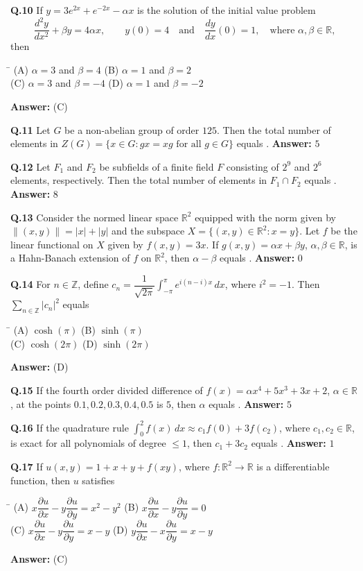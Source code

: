 \documentclass[11pt,a4paper]{article}
\newcommand{\optsfourA}[4]{%
  \begin{tabbing}
    \hspace{0.48\linewidth}\=\kill
    (A) #1 \> (B) #2 \\[2pt]
    (C) #3 \> (D) #4
  \end{tabbing}%
}
\newcommand{\ans}[1]{\textbf{Answer:} #1\par\medskip}
\begin{document}
\textbf{Q.10} If $y = 3e^{2x} + e^{-2x} - \alpha x$ is the solution of the initial value problem
\[
  \frac{d^2 y}{dx^2} + \beta y = 4\alpha x, \qquad y(0) = 4 \quad \text{and} \quad \frac{dy}{dx}(0) = 1, \quad \text{where } \alpha, \beta \in \mathbb{R},
\]
then
\optsfourA{$\alpha = 3$ and $\beta = 4$}{$\alpha = 1$ and $\beta = 2$}{$\alpha = 3$ and $\beta = -4$}{$\alpha = 1$ and $\beta = -2$}
\ans{(C)}

\textbf{Q.11} Let $G$ be a non-abelian group of order $125$. Then the total number of elements in $Z(G) = \{x \in G : gx = xg \text{ for all } g \in G\}$ equals \underline{\hspace{2cm}}.
\ans{$5$}

\textbf{Q.12} Let $F_1$ and $F_2$ be subfields of a finite field $F$ consisting of $2^9$ and $2^6$ elements, respectively. Then the total number of elements in $F_1 \cap F_2$ equals \underline{\hspace{2cm}}.
\ans{$8$}

\textbf{Q.13} Consider the normed linear space $\mathbb{R}^2$ equipped with the norm given by $\|(x, y)\| = |x| + |y|$ and the subspace $X = \{(x, y) \in \mathbb{R}^2 : x = y\}$. Let $f$ be the linear functional on $X$ given by $f(x, y) = 3x$. If $g(x, y) = \alpha x + \beta y$, $\alpha, \beta \in \mathbb{R}$, is a Hahn-Banach extension of $f$ on $\mathbb{R}^2$, then $\alpha - \beta$ equals \underline{\hspace{2cm}}.
\ans{$0$}

\textbf{Q.14} For $n \in \mathbb{Z}$, define $c_n = \dfrac{1}{\sqrt{2\pi}} \displaystyle\int_{-\pi}^{\pi} e^{i(n - i)x}\,dx$, where $i^2 = -1$. Then $\displaystyle\sum_{n \in \mathbb{Z}} |c_n|^2$ equals
\optsfourA{$\cosh(\pi)$}{$\sinh(\pi)$}{$\cosh(2\pi)$}{$\sinh(2\pi)$}
\ans{(D)}

\textbf{Q.15} If the fourth order divided difference of $f(x) = \alpha x^4 + 5x^3 + 3x + 2$, $\alpha \in \mathbb{R}$, at the points $0.1, 0.2, 0.3, 0.4, 0.5$ is $5$, then $\alpha$ equals \underline{\hspace{2cm}}.
\ans{$5$}

\textbf{Q.16} If the quadrature rule $\displaystyle\int_0^2 f(x)\,dx \approx c_1 f(0) + 3 f(c_2)$, where $c_1, c_2 \in \mathbb{R}$, is exact for all polynomials of degree $\le 1$, then $c_1 + 3c_2$ equals \underline{\hspace{2cm}}.
\ans{$1$}

\textbf{Q.17} If $u(x, y) = 1 + x + y + f(xy)$, where $f : \mathbb{R}^2 \to \mathbb{R}$ is a differentiable function, then $u$ satisfies
\optsfourA{$x\dfrac{\partial u}{\partial x} - y\dfrac{\partial u}{\partial y} = x^2 - y^2$}{$x\dfrac{\partial u}{\partial x} - y\dfrac{\partial u}{\partial y} = 0$}{$x\dfrac{\partial u}{\partial x} - y\dfrac{\partial u}{\partial y} = x - y$}{$y\dfrac{\partial u}{\partial x} - x\dfrac{\partial u}{\partial y} = x - y$}
\ans{(C)}
\end{document}
